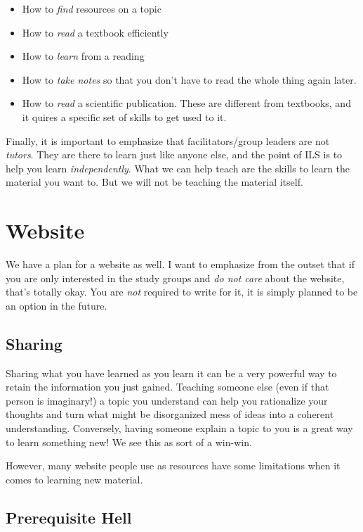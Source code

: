 \documentclass[mpinclude=true]{scrartcl}
\begin{document}
\begin{itemize}
\item How to \emph{find} resources on a topic
\item How to \emph{read} a textbook efficiently
\item How to \emph{learn} from a reading
\item How to \emph{take notes} so that you don't have to read the whole thing
again later.
\item How to \emph{read} a scientific publication.  These are different from
textbooks, and it quires a specific set of skills to get used to it.
\end{itemize}

Finally, it is important to emphasize that facilitators/group leaders
are not \emph{tutors}.  They are there to learn just like anyone else, and
the point of ILS is to help you learn \emph{independently}.  What we can
help teach are the skills to learn the material you want to.  But we
will not be teaching the material itself.

\section{Website}


We have a plan for a website as well.  I want to emphasize from the
outset that if you are only interested in the study groups and \emph{do not
care} about the website, that's totally okay.  You are \emph{not} required
to write for it, it is simply planned to be an option in the future.

\subsection{Sharing}


Sharing what you have learned as you learn it can be a very powerful
way to retain the information you just gained.  Teaching someone else
(even if that person is imaginary!) a topic you understand can help
you rationalize your thoughts and turn what might be disorganized mess
of ideas into a coherent understanding.  Conversely, having someone
explain a topic to you is a great way to learn something new!  We see
this as sort of a win-win.

However, many website people use as resources have some limitations
when it comes to learning new material.

\subsection{Prerequisite Hell}
\end{document}
